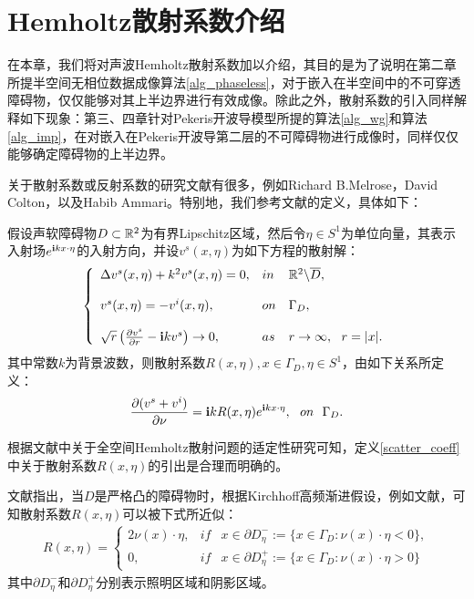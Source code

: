 
\chapter{Hemholtz散射系数介绍}
\label{chapter:ref1}
在本章，我们将对声波Hemholtz散射系数加以介绍，其目的是为了说明在第二章所提半空间无相位数据成像算法\ref{alg_phaseless}，对于嵌入在半空间中的不可穿透障碍物，仅仅能够对其上半边界进行有效成像。除此之外，散射系数的引入同样解释如下现象：第三、四章针对Pekeris开波导模型所提的算法\ref{alg_wg}和算法\ref{alg_imp}，在对嵌入在Pekeris开波导第二层的不可障碍物进行成像时，同样仅仅能够确定障碍物的上半边界。

关于散射系数或反射系数的研究文献有很多，例如Richard B.Melrose\cite{Melrose1985Near}，David Colton\cite{colton-kress}，以及Habib Ammari\cite{Ammari2013Enhancement,Ammari2013The,Ammari2015Super,Hirst2013Enhancement}。特别地，我们参考文献\cite[Definition 4.1]{ch_ha}的定义，具体如下：
\begin{definition}\label{scatter_coeff}
假设声软障碍物$D\subset\mathbb{R}^2$为有界Lipschitz区域，然后令$\eta\in S^1$为单位向量，其表示入射场$e^{\mathbf{i} kx\cdot\eta}$的入射方向，并设$v^s(x,\eta)$为如下方程的散射解：
\begin{eqnarray}
\left\{
\begin{array}{lll}
\Delta v^s(x,\eta)+k^2v^s(x,\eta)=0,&in&\mathbb{R}^2\backslash\overline{D},\\
& &\\
v^s(x,\eta)=-v^i(x,\eta),& on& \Gamma_D,\\
& &\\
\sqrt{r}\left(\frac{\partial v^s}{\partial r}-\mathbf{i} kv^s\right)\rightarrow0,& as& r\rightarrow\infty,\ \ r=|x|.
\end{array}
\right.
\end{eqnarray}
其中常数$k$为背景波数，则散射系数$R(x,\eta),x\in\Gamma_D,\eta\in S^1$，由如下关系所定义：
\begin{equation}
\frac{\partial(v^s+v^i)}{\partial\nu}=\mathbf{i} kR(x,\eta)e^{\mathbf{i} kx\cdot\eta},\ \ on\  \ \Gamma_D.
\end{equation}
\end{definition}
\begin{remark}
根据文献\cite{colton-kress,cc14}中关于全空间Hemholtz散射问题的适定性研究可知，定义\ref{scatter_coeff}中关于散射系数$R(x,\eta)$的引出是合理而明确的。
\end{remark}
文献\cite{ch_ha}指出，当$D$是严格凸的障碍物时，根据Kirchhoff高频渐进假设，例如文献\cite{bcs,Melrose1985Near}，可知散射系数$R(x,\eta)$可以被下式所近似：
\begin{eqnarray}\label{kir_app}
  R(x,\eta)=
  \left\{
\begin{array}{lll}
2\nu(x)\cdot\eta,&if&x\in\partial D^-_{\eta}:=\{x\in\Gamma_D:\nu(x)\cdot\eta<0\},\\
0,&if&x\in\partial D^+_{\eta}:=\{x\in\Gamma_D:\nu(x)\cdot\eta>0\}
\end{array}
  \right.
\end{eqnarray}
其中$\partial D^-_{\eta}$和$\partial D^+_{\eta}$分别表示照明区域和阴影区域。

